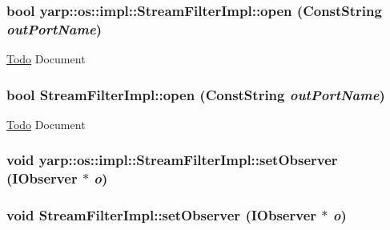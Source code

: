 \label{classyarp_1_1os_1_1impl_1_1_stream_filter_impl_a9ffe25ea43e69bcc50d3334fea26fff5}
\hypertarget{classyarp_1_1os_1_1impl_1_1_stream_filter_impl_addabbbd78373c7aa7e4712776064891e}{
\subsubsection[{open}]{\setlength{\rightskip}{0pt plus 5cm}bool yarp::os::impl::StreamFilterImpl::open (ConstString {\em outPortName})}}
\label{classyarp_1_1os_1_1impl_1_1_stream_filter_impl_addabbbd78373c7aa7e4712776064891e}
\begin{Desc}
\item[\hyperlink{todo__todo000015}{Todo}]Document \end{Desc}
\hypertarget{classyarp_1_1os_1_1impl_1_1_stream_filter_impl_a89e921dc1fa47bc6136bc3135e89ae03}{
\subsubsection[{open}]{\setlength{\rightskip}{0pt plus 5cm}bool StreamFilterImpl::open (ConstString {\em outPortName})}}
\label{classyarp_1_1os_1_1impl_1_1_stream_filter_impl_a89e921dc1fa47bc6136bc3135e89ae03}
\begin{Desc}
\item[\hyperlink{todo__todo000005}{Todo}]Document \end{Desc}
\hypertarget{classyarp_1_1os_1_1impl_1_1_stream_filter_impl_aa3486d2806b76cf08b4594a1a0b367d7}{
\subsubsection[{setObserver}]{\setlength{\rightskip}{0pt plus 5cm}void yarp::os::impl::StreamFilterImpl::setObserver ({\bf IObserver} $\ast$ {\em o})}}
\label{classyarp_1_1os_1_1impl_1_1_stream_filter_impl_aa3486d2806b76cf08b4594a1a0b367d7}
\hypertarget{classyarp_1_1os_1_1impl_1_1_stream_filter_impl_a269889b1cdc1992968861e49d7542e5d}{
\subsubsection[{setObserver}]{\setlength{\rightskip}{0pt plus 5cm}void StreamFilterImpl::setObserver ({\bf IObserver} $\ast$ {\em o})}}
\label{classyarp_1_1os_1_1impl_1_1_stream_filter_impl_a269889b1cdc1992968861e49d7542e5d}


